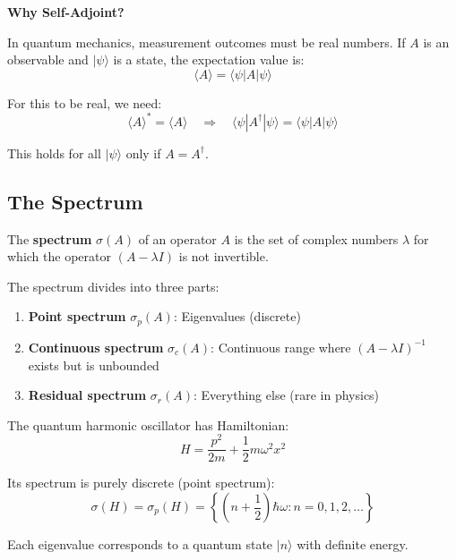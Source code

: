 \begin{level1}
\textbf{Why Self-Adjoint?}

In quantum mechanics, measurement outcomes must be real numbers. If $A$ is an observable and $|\psi\rangle$ is a state, the expectation value is:
\begin{equation}
\langle A \rangle = \langle \psi | A | \psi \rangle
\end{equation}

For this to be real, we need:
\begin{equation}
\langle A \rangle^* = \langle A \rangle \quad \Rightarrow \quad \langle \psi | A^\dagger | \psi \rangle = \langle \psi | A | \psi \rangle
\end{equation}

This holds for all $|\psi\rangle$ only if $A = A^\dagger$.
\end{level1}

\subsection{The Spectrum}

\begin{definition}\label{def:spectrum}
The \textbf{spectrum} $\sigma(A)$ of an operator $A$ is the set of complex numbers $\lambda$ for which the operator $(A - \lambda I)$ is not invertible.

The spectrum divides into three parts:
\begin{enumerate}
\item \textbf{Point spectrum} $\sigma_p(A)$: Eigenvalues (discrete)
\item \textbf{Continuous spectrum} $\sigma_c(A)$: Continuous range where $(A - \lambda I)^{-1}$ exists but is unbounded
\item \textbf{Residual spectrum} $\sigma_r(A)$: Everything else (rare in physics)
\end{enumerate}
\end{definition}

\begin{example}\label{ex:harmonic-oscillator-spectrum}
The quantum harmonic oscillator has Hamiltonian:
\begin{equation}
H = \frac{p^2}{2m} + \frac{1}{2}m\omega^2 x^2
\end{equation}

Its spectrum is purely discrete (point spectrum):
\begin{equation}
\sigma(H) = \sigma_p(H) = \left\{ \left( n + \frac{1}{2} \right)\hbar\omega : n = 0, 1, 2, \ldots \right\}
\end{equation}

Each eigenvalue corresponds to a quantum state $|n\rangle$ with definite energy.
\end{example}

